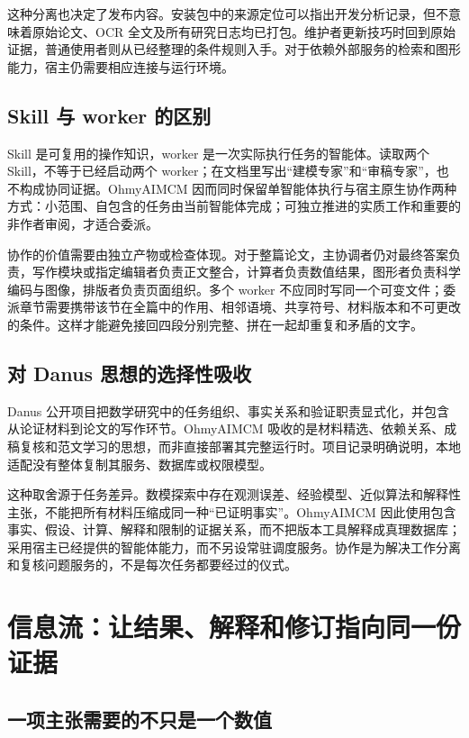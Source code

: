 \documentclass[UTF8,a4paper,zihao=-4,fontset=fandol]{ctexart}
\newcommand{\sys}{\textsf{OhmyAIMCM}}
\begin{document}
这种分离也决定了发布内容。安装包中的来源定位可以指出开发分析记录，但不意味着原始论文、OCR 全文及所有研究日志均已打包。维护者更新技巧时回到原始证据，普通使用者则从已经整理的条件规则入手。对于依赖外部服务的检索和图形能力，宿主仍需要相应连接与运行环境。

\subsection{Skill 与 worker 的区别}

Skill 是可复用的操作知识，worker 是一次实际执行任务的智能体。读取两个 Skill，不等于已经启动两个 worker；在文档里写出“建模专家”和“审稿专家”，也不构成协同证据。\sys{} 因而同时保留单智能体执行与宿主原生协作两种方式：小范围、自包含的任务由当前智能体完成；可独立推进的实质工作和重要的非作者审阅，才适合委派。

协作的价值需要由独立产物或检查体现。对于整篇论文，主协调者仍对最终答案负责，写作模块或指定编辑者负责正文整合，计算者负责数值结果，图形者负责科学编码与图像，排版者负责页面组织。多个 worker 不应同时写同一个可变文件；委派章节需要携带该节在全篇中的作用、相邻语境、共享符号、材料版本和不可更改的条件。这样才能避免接回四段分别完整、拼在一起却重复和矛盾的文字。

\subsection{对 Danus 思想的选择性吸收}

Danus 公开项目把数学研究中的任务组织、事实关系和验证职责显式化，并包含从论证材料到论文的写作环节\cite{danus}。\sys{} 吸收的是材料精选、依赖关系、成稿复核和范文学习的思想，而非直接部署其完整运行时。项目记录明确说明，本地适配没有整体复制其服务、数据库或权限模型\cite{integration}。

这种取舍源于任务差异。数模探索中存在观测误差、经验模型、近似算法和解释性主张，不能把所有材料压缩成同一种“已证明事实”。\sys{} 因此使用包含事实、假设、计算、解释和限制的证据关系，而不把版本工具解释成真理数据库；采用宿主已经提供的智能体能力，而不另设常驻调度服务。协作是为解决工作分离和复核问题服务的，不是每次任务都要经过的仪式。

\section{信息流：让结果、解释和修订指向同一份证据}

\subsection{一项主张需要的不只是一个数值}
\end{document}
